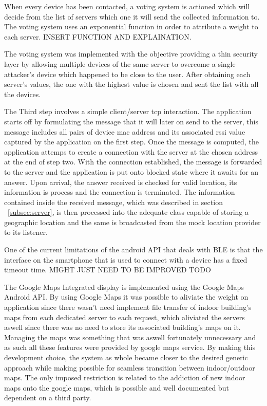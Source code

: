 \documentclass[a4paper]{IEEEtran}
\begin{document}
When every device has been contacted, a voting system is actioned which will decide from the list of servers which one it will send the collected information to. The voting system uses an exponential function in order to attribute a weight to each server. INSERT FUNCTION AND EXPLAINATION.

The voting system was implemented with the objective providing a thin security layer by allowing multiple devices of the same server to overcome a single attacker's device which happened to be close to the user. After obtaining each server's values, the one with the highest value is chosen and sent the list with all the devices. 

The Third step involves a simple client/server tcp interaction. The application starts off by formulating the message that it will later on send to the server, this message includes all pairs of device mac address and its associated rssi value captured by the application on the first step. Once the message is computed, the application attemps to create a connection with the server at the chosen address at the end of step two. With the connection established, the message is forwarded to the server and the application is put onto blocked state where it awaits for an answer. Upon arrival, the answer received is checked for valid location, its information is process and the connection is terminated. The information contained inside the received message, which was described in section ~\ref{subsec:server}, is then processed into the adequate class capable of storing a geographic location and the same is broadcasted from the mock location provider to its listener. 



One of the current limitations of the android API that deals with BLE is that the interface on the smartphone that is used to connect with a device has a fixed timeout time.  MIGHT JUST NEED TO BE IMPROVED TODO


The Google Maps Integrated display is implemented using the Google Maps Android API. By using Google Maps it was possible to aliviate the weight on application since there wasn't need implement file transfer of indoor building's maps from each dedicated server to each request, which aliviated the servers aswell since there was no need to store its associated building's maps on it. Managing the maps was something that was aswell fortunately unnecessary and as such all these features were provided by google maps service. By making this development choice, the system as whole became closer to the desired generic approach while making possible for seamless transition between indoor/outdoor maps. The only imposed restriction is related to the addiction of new indoor maps onto the google maps, which is possible and well documented but dependent on a third party.
\end{document}
